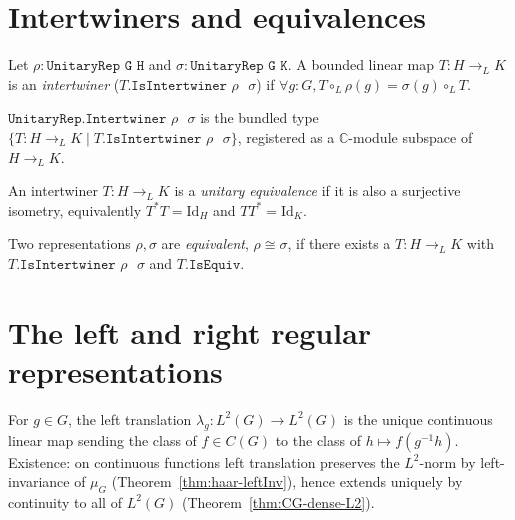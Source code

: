 \section{Intertwiners and equivalences}

\begin{definition}
  \label{def:isIntertwiner}
  \leanok
  Let $\rho : \texttt{UnitaryRep G H}$ and $\sigma : \texttt{UnitaryRep G K}$.
  A bounded linear map $T : H \to_L K$ is an \emph{intertwiner}
  ($T.\texttt{IsIntertwiner $\rho$ $\sigma$}$) if
  $\forall g : G, T \circ_L \rho(g) = \sigma(g) \circ_L T$.
\end{definition}

\begin{definition}
  \label{def:Intertwiner}
  \leanok
  $\texttt{UnitaryRep.Intertwiner $\rho$ $\sigma$}$ is the bundled type
  $\{T : H \to_L K \mid T.\texttt{IsIntertwiner $\rho$ $\sigma$}\}$,
  registered as a $\mathbb C$-module subspace of $H \to_L K$.
\end{definition}

\begin{definition}
  \label{def:isEquiv}
  \leanok
  An intertwiner $T : H \to_L K$ is a \emph{unitary equivalence} if
  it is also a surjective isometry, equivalently $T^* T = \mathrm{Id}_H$
  and $T T^* = \mathrm{Id}_K$.
\end{definition}

\begin{definition}
  \label{def:Equiv}
  \leanok
  Two representations $\rho, \sigma$ are \emph{equivalent},
  $\rho \cong \sigma$, if there exists a $T : H \to_L K$ with
  $T.\texttt{IsIntertwiner $\rho$ $\sigma$}$ and
  $T.\texttt{IsEquiv}$.
\end{definition}


\section{The left and right regular representations}

\begin{definition}
  \label{def:leftTransL2}
  For $g \in G$, the left translation $\lambda_g : L^2(G) \to L^2(G)$
  is the unique continuous linear map sending the class of
  $f \in C(G)$ to the class of $h \mapsto f(g^{-1} h)$. Existence:
  on continuous functions left translation preserves the $L^2$-norm
  by left-invariance of $\mu_G$ (Theorem~\ref{thm:haar-leftInv}),
  hence extends uniquely by continuity to all of $L^2(G)$
  (Theorem~\ref{thm:CG-dense-L2}).
\end{definition}

